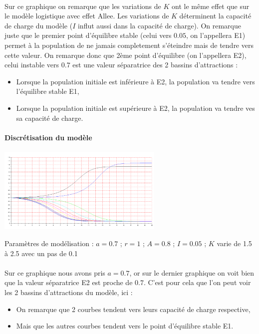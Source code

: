 \documentclass{article}
\begin{document}
\paragraph{}
Sur ce graphique on remarque que les variations de $K$ ont le même effet que sur le modèle logistique avec effet Allee. Les variations de $K$ déterminent la capacité de charge du modèle ($I$ influt aussi dans la capacité de charge). On remarque juste que le premier point d'équilibre stable (celui vers $0.05$, on l'appellera E1) permet à la population de ne jamais completement s'éteindre mais de tendre vers cette valeur.
On remarque donc que 2ème point d'équilibre (on l'appellera E2), celui instable vers $0.7$ est une valeur séparatrice des 2 bassins d'attractions :
\begin{itemize}
\item Lorsque la population initiale est inférieure à E2, la population va tendre vers l'équilibre stable E1,
\item Lorsque la population initiale est supérieure à E2, la population va tendre ves sa capacité de charge.
\end{itemize}

\paragraph{Discrétisation du modèle}
\begin{center}
\includegraphics[width=300px]{img/part1/TrajK.png}
\end{center}
Paramètres de modélisation : $a=0.7$ ; $r=1$ ; $A=0.8$ ; $I=0.05$ ; $K$ varie de 1.5 à 2.5 avec un pas de 0.1
\paragraph{}
Sur ce graphique nous avons pris $a=0.7$, or sur le dernier graphique on voit bien que la valeur séparatrice E2 est proche de $0.7$. C'est pour cela que l'on peut voir les 2 bassins d'attractions du modèle, ici :
\begin{itemize}
\item On remarque que 2 courbes tendent vers leurs capacité de charge respective,
\item Mais que les autres courbes tendent vers le point d'équilibre stable E1.
\end{itemize}
\end{document}
